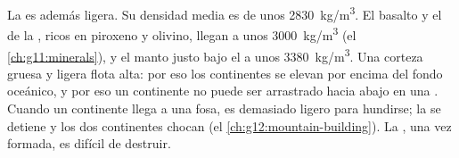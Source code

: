 La  es además ligera. Su densidad media es de unos
\qty{2830}{kg/m^3}. El basalto y el  de la , ricos en
piroxeno y olivino, llegan a unos \qty{3000}{kg/m^3}
(el \cref{ch:g11:minerals}), y el manto justo bajo el  a unos
\qty{3380}{kg/m^3}. Una corteza gruesa y ligera flota alta: por eso los
continentes se elevan por encima del fondo oceánico, y por eso un continente
no puede ser arrastrado hacia abajo en una . Cuando un
continente llega a una fosa, es demasiado ligero para hundirse; la 
se detiene y los dos continentes chocan (el \cref{ch:g12:mountain-building}).
La , una vez formada, es difícil de destruir.

